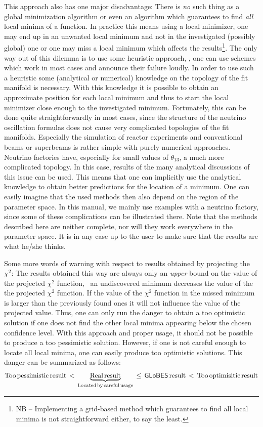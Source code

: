 This approach also has one major disadvantage: There is \emph{no} such
thing as a global minimization algorithm or even an algorithm which guarantees
to find \emph{all} local minima of a function. In practice this means using 
 a local minimizer, one may end up in an unwanted local minimum and not in 
the investigated (possibly global) one or 
one may miss a local minimum which affects the results\footnote{NB -- 
Implementing a grid-based method which guarantees to find all local minima is
not straightforward either, to say the least.}. 
The only way out of this dilemma is to use some heuristic approach, \ie , 
one can use schemes which work
in most cases and announce their failure loudly. In order to use such a
heuristic some (analytical or numerical) knowledge on the topology of 
the fit manifold is necessary. With this knowledge it is possible
to obtain an approximate position for each local minimum 
and thus to start the local minimizer 
close enough to the investigated minimum.
 Fortunately, this can be done quite straightforwardly in most cases, since 
the structure of the neutrino oscillation formulas does not cause very 
complicated topologies of the fit manifolds. Especially the simulation of 
reactor experiments and conventional beams or superbeams is rather simple 
with purely numerical
approaches. Neutrino factories have, especially for small values of
$\theta_{13}$, a much more complicated topology. In this case, results
of the many analytical discussions of this issue can be used. This means
 that one can implicitly use the analytical knowledge to obtain 
better predictions for the location of a minimum. One can easily imagine 
that the used methods then also depend
on the region of the parameter space. In this manual, we mainly use
examples with a neutrino factory, since some of these complications
can be illustrated there. Note that the methods described here are neither
complete, nor will they work everywhere in the parameter space. It is
in any case up to the user to make sure that the results are what he/she
thinks.

Some more words of warning with respect to results obtained by projecting
the $\chi^2$:
The results obtained this way are always only an \emph{upper} bound on the
value of the projected $\chi^2$ function, \ie\ an undiscovered minimum 
decreases the value of the the projected $\chi^2$ function. If the value
of the $\chi^2$ function in the missed minimum is larger than the
previously found ones it will not influence the value of the projected 
value. 
Thus, one can only run the danger to obtain a too optimistic solution 
if one does not find the other local minima appearing 
below the chosen confidence level. With this approach and proper usage,
 it should not be possible to produce a too pessimistic solution. 
However, if one is not careful enough to locate
all local minima, one can easily produce too optimistic solutions.
This danger can be summarized as follows:
\begin{equation}
\mathrm{Too \, pessimistic \, result} \, < \, \underbrace{\mathrm{Real \, result}}_{\mathrm{Located \, by \, careful \, usage}} \, \le \, \mathrm{{\sf GLoBES} \, result} \,  < \,  \mathrm{Too \, optimisitic \, result} \nonumber
\end{equation}

